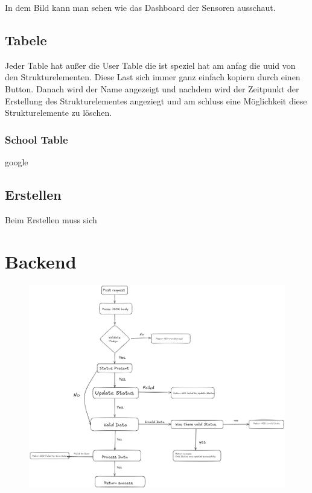 \begin{inhalt}
\begin{enumerate}[label=\textbf{\arabic*.}]
\clearpage


In dem Bild kann man sehen wie das Dashboard der Sensoren ausschaut.

\subsection{Tabele}

Jeder Table hat außer die User Table die ist speziel hat am anfag die uuid von den Strukturelementen. Diese Last sich immer ganz einfach kopiern durch einen Button. Danach wird der Name angezeigt und nachdem wird der Zeitpunkt der Erstellung des Strukturelementes angeziegt und am schluss eine Möglichkeit diese Strukturelemente zu löschen. 



\subsubsection{School Table}

google



\subsection{Erstellen}

Beim Erstellen muss sich 





\newpage

\section{Backend}





\begin{figure}[!htb]
\centering
\includegraphics[width=1\textwidth]{files/Thomas/pics/Website/backend/image.png}
\caption[Bildbezeichnung für Abbildungsverzeichnis]{}
\label{fig:gehaeuse_internet_bild}
\end{figure}


\end{enumerate}
\end{inhalt}
